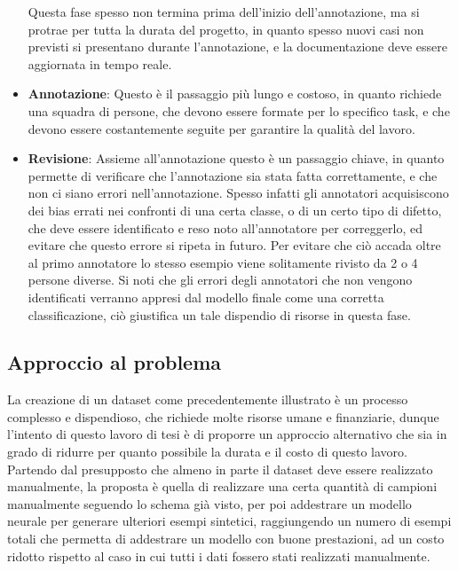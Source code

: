 \begin{itemize}
        Questa fase spesso non termina prima dell'inizio dell'annotazione, ma si protrae per tutta la durata del progetto, in quanto
        spesso nuovi casi non previsti si presentano durante l'annotazione, e la documentazione deve essere aggiornata in tempo reale.
    \item \textbf{Annotazione}: Questo è il passaggio più lungo e costoso, in quanto richiede una squadra di persone,
        che devono essere formate per lo specifico task, e che devono essere costantemente seguite per garantire la qualità del lavoro.
    \item \textbf{Revisione}: Assieme all'annotazione questo è un passaggio chiave, in quanto permette di verificare che l'annotazione sia stata fatta correttamente,
        e che non ci siano errori nell'annotazione. Spesso infatti gli annotatori acquisiscono dei bias errati nei confronti di una certa classe, o di un certo tipo di difetto, 
        che deve essere identificato e reso noto all'annotatore per correggerlo, ed evitare che questo errore si ripeta in futuro.
        Per evitare che ciò accada oltre al primo annotatore lo stesso esempio viene solitamente rivisto da 2 o 4 persone diverse.
        Si noti che gli errori degli annotatori che non vengono identificati verranno appresi dal modello finale come una corretta classificazione, ciò giustifica un tale 
        dispendio di risorse in questa fase.
\end{itemize} 

\subsection{Approccio al problema \ok}

La creazione di un dataset come precedentemente illustrato è un processo complesso e dispendioso, che richiede molte risorse umane e finanziarie,
dunque l'intento di questo lavoro di tesi è di proporre un approccio alternativo che sia in grado di ridurre per quanto possibile la durata e il costo
di questo lavoro.
Partendo dal presupposto che almeno in parte il dataset deve essere realizzato manualmente, la proposta è quella di realizzare una certa 
quantità di campioni manualmente seguendo lo schema già visto, per poi addestrare un modello neurale per generare ulteriori esempi sintetici,
raggiungendo un numero di esempi totali che permetta di addestrare un modello con buone prestazioni, ad un costo ridotto rispetto al caso in cui
tutti i dati fossero stati realizzati manualmente.

